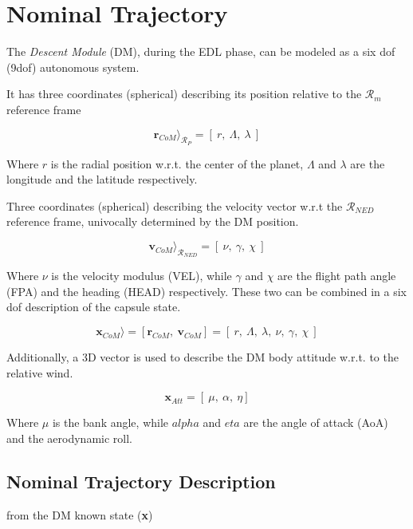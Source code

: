 \chapter{Nominal Trajectory}

The \textit{Descent Module} (DM), during the EDL phase, can be modeled as a
six dof (9dof) autonomous system.

It has three coordinates (spherical) describing its position relative to the
$\mathcal{R}_{m}$ reference frame

        $$
            \textbf{r}_{CoM}\rangle_{\mathcal{R}_{P}} = [\: r,\:\Lambda,\:\lambda \:]
        $$

\noindent Where $r$ is the radial position w.r.t. the center of the planet, $\Lambda$ and $\lambda$ are 
the longitude and the latitude respectively.

Three coordinates (spherical) describing the velocity vector w.r.t the $\mathcal{R}_{NED}$ reference frame, univocally
determined by the DM position.

        $$
            \textbf{v}_{CoM}\rangle_{\mathcal{R}_{NED}} = [\: \nu,\:\gamma,\:\chi \:]
        $$

\noindent Where $\nu$ is the velocity modulus (VEL), while $\gamma$ and $\chi$ are the flight
path angle (FPA) and the heading (HEAD) respectively.
These two can be combined in a six dof description of the capsule state.

        $$
            \textbf{x}_{CoM}\rangle = [\textbf{r}_{CoM},\: \textbf{v}_{CoM}] = [\: r,\:\Lambda,\:\lambda, \: \nu,\:\gamma,\:\chi \:]
        $$

Additionally, a 3D vector is used to describe the DM body attitude w.r.t. to the relative wind.

        $$
            \textbf{x}_{Att} = [\: \mu,\: \alpha,\: \eta]
        $$

\noindent Where $\mu$ is the bank angle, while $alpha$ and $eta$ are the 
angle of attack (AoA) and the aerodynamic roll.


\newpage

\section{Nominal Trajectory Description}

from the DM known state (\textbf{x})